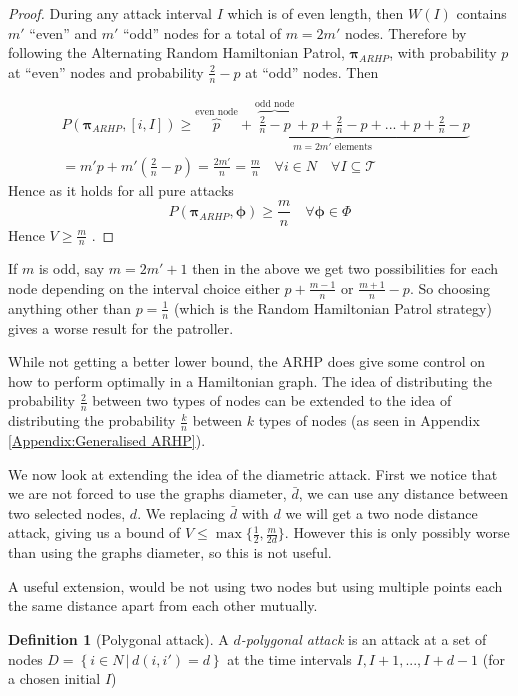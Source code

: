 \documentclass[a4paper,10pt]{article}
\newcommand{\set}[2]{\left\{ #1 \, | \, #2 \right\}}
\theoremstyle{definition}
\newtheorem{definition}[theorem]{Definition}
\theoremstyle{definition}
\theoremstyle{remark}
\theoremstyle{definition}
\begin{document}
\begin{proof}
During any attack interval $I$ which is of even length, then $W(I)$ contains $m'$ ``even'' and $m'$ ``odd'' nodes for a total of $m=2m'$ nodes. Therefore by following the Alternating Random Hamiltonian Patrol, $\pmb{\pi}_{ARHP}$, with probability $p$ at ``even'' nodes and probability $\frac{2}{n}-p$ at ``odd'' nodes. Then

\begin{align*}
&P(\bm{\pi}_{ARHP},[i,I]) \geq \underbrace{\overbrace{p}^{\text{even node}}+\overbrace{\frac{2}{n}-p}^{\text{odd node}}+p+\frac{2}{n}-p+...+p+\frac{2}{n}-p}_{m=2m' \text{ elements}} \\
&=m' p+m'(\frac{2}{n}-p)=\frac{2m'}{n}=\frac{m}{n} \quad \forall i \in N \quad \forall I \subseteq \mathcal{T}
\end{align*}
Hence as it holds for all pure attacks
$$P(\bm{\pi}_{ARHP},\bm{\phi}) \geq \frac{m}{n} \quad \forall \bm{\phi} \in \Phi$$
Hence $V \geq \frac{m}{n}$ .
\end{proof}

If $m$ is odd, say $m=2m'+1$ then in the above we get two possibilities for each node depending on the interval choice either $p+\frac{m-1}{n}$ or $\frac{m+1}{n}-p$. So choosing anything other than $p=\frac{1}{n}$ (which is the Random Hamiltonian Patrol strategy) gives a worse result for the patroller.

While not getting a better lower bound, the ARHP does give some control on how to perform optimally in a Hamiltonian graph. The idea of distributing the probability $\frac{2}{n}$ between two types of nodes can be extended to the idea of distributing the probability $\frac{k}{n}$ between $k$ types of nodes (as seen in Appendix \ref{Appendix:Generalised ARHP}).


We now look at extending the idea of the diametric attack. First we notice that we are not forced to use the graphs diameter, $\bar{d}$, we can use any distance between two selected nodes, $d$. We replacing $\bar{d}$ with $d$ we will get a two node distance attack, giving us a bound of $V \leq \max \{\frac{1}{2} ,\frac{m}{2d} \}$. However this is only possibly worse than using the graphs diameter, so this is not useful.

A useful extension, would be not using two nodes but using multiple points each the same distance apart from each other mutually.

\begin{definition}[Polygonal attack]
A \textit{$d$-polygonal attack} is an attack at a set of nodes $D= \set{i \in N}{ d(i,i')=d}$ at the time intervals $I,I+1,...,I+d-1$ (for a chosen initial $I$)
\end{definition}
\end{document}
